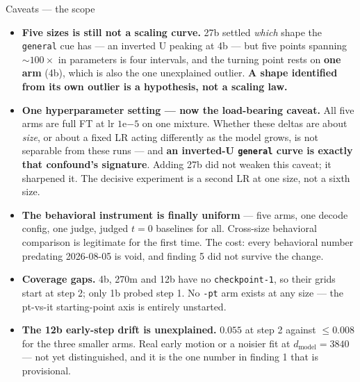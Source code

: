 \documentclass[aspectratio=169,10pt]{beamer}
\newcommand{\good}[1]{\textcolor{up}{#1}}
\newcommand{\bad}[1]{\textcolor{down}{#1}}
\begin{document}
\begin{frame}{Caveats --- the scope}
  \small
  \begin{itemize}\setlength{\itemsep}{0.7em}
    \item \bad{\textbf{Five sizes is still not a scaling curve.}} 27b settled
      \emph{which} shape the \texttt{general} cue has --- an inverted U peaking
      at 4b --- but five points spanning ${\sim}100\times$ in parameters is four
      intervals, and the turning point rests on \textbf{one arm} (4b), which is
      also the one unexplained outlier. \textbf{A shape identified from its own
      outlier is a hypothesis, not a scaling law.}
    \item \bad{\textbf{One hyperparameter setting --- now the load-bearing
      caveat.}} All five arms are full FT at lr $1\mathrm{e}{-5}$ on one
      mixture. Whether these deltas are about \emph{size}, or about a fixed LR
      acting differently as the model grows, is not separable from these runs ---
      and \textbf{an inverted-U \texttt{general} curve is exactly that confound's
      signature}. \good{Adding 27b did not weaken this caveat; it sharpened it.}
      The decisive experiment is a second LR at one size, not a sixth size.
    \item \good{\textbf{The behavioral instrument is finally uniform}} --- five
      arms, one decode config, one judge, judged $t{=}0$ baselines for all.
      Cross-size behavioral comparison is legitimate for the first time.
      \bad{The cost:} every behavioral number predating 2026-08-05 is void, and
      finding 5 did not survive the change.
    \item \textbf{Coverage gaps.} 4b, 270m and 12b have no
      \texttt{checkpoint-1}, so their grids start at step 2; only 1b probed
      step 1. No \texttt{-pt} arm exists at any size --- the pt-vs-it
      starting-point axis is entirely unstarted.
    \item \textbf{The 12b early-step drift is unexplained.} $0.055$ at step 2
      against ${\leq}0.008$ for the three smaller arms. Real early motion or a
      noisier fit at $d_\text{model}{=}3840$ --- not yet distinguished, and it
      is the one number in finding 1 that is provisional.
  \end{itemize}
\end{frame}
\end{document}
